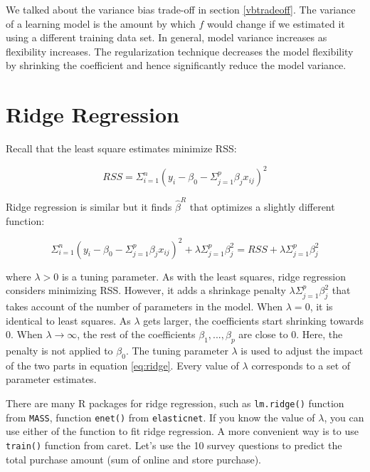 \documentclass[12pt,]{krantz}
\begin{document}
We talked about the variance bias trade-off in section \ref{vbtradeoff}. The variance of a learning model is the amount by which \(\hat{f}\) would change if we estimated it using a different training data set. In general, model variance increases as flexibility increases. The regularization technique decreases the model flexibility by shrinking the coefficient and hence significantly reduce the model variance.

\hypertarget{ridge-regression}{%
\section{Ridge Regression}\label{ridge-regression}}

Recall that the least square estimates minimize RSS:

\[RSS=\Sigma_{i=1}^{n}(y_{i}-\beta_{0}-\Sigma_{j=1}^{p}\beta_{j}x_{ij})^{2}\]

Ridge regression \citep{Hoerl1970} is similar but it finds \(\hat{\beta}^{R}\) that optimizes a slightly different function:

\begin{equation}
\Sigma_{i=1}^{n}(y_{i}-\beta_{0}-\Sigma_{j=1}^{p}\beta_{j}x_{ij})^{2}+\lambda\Sigma_{j=1}^{p}\beta_{j}^{2}=RSS+\lambda\Sigma_{j=1}^{p}\beta_{j}^{2}
\label{eq:ridge}
\end{equation}

where \(\lambda >0\) is a tuning parameter. As with the least squares, ridge regression considers minimizing RSS. However, it adds a shrinkage penalty \(\lambda\Sigma_{j=1}^{p}\beta_{j}^{2}\) that takes account of the number of parameters in the model. When \(\lambda = 0\), it is identical to least squares. As \(\lambda\) gets larger, the coefficients start shrinking towards 0. When \(\lambda\rightarrow\infty\), the rest of the coefficients \(\beta_{1},...,\beta_{p}\) are close to 0. Here, the penalty is not applied to \(\beta_{0}\). The tuning parameter \(\lambda\) is used to adjust the impact of the two parts in equation \eqref{eq:ridge}. Every value of \(\lambda\) corresponds to a set of parameter estimates.

There are many R packages for ridge regression, such as \texttt{lm.ridge()} function from \texttt{MASS}, function \texttt{enet()} from \texttt{elasticnet}. If you know the value of \(\lambda\), you can use either of the function to fit ridge regression. A more convenient way is to use \texttt{train()} function from caret. Let's use the 10 survey questions to predict the total purchase amount (sum of online and store purchase).
\end{document}

